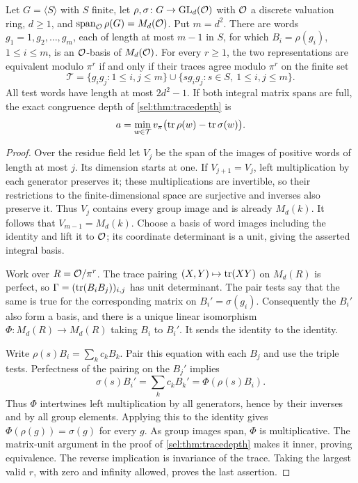 \begin{theorem}\label{sel:thm:finitewords}
Let $G=\langle S\rangle$ with $S$ finite, let
$\rho,\sigma\colon G\to\operatorname{GL}_d(\mathcal{O})$ with $\mathcal{O}$ a discrete valuation ring,
$d\ge1$, and $\operatorname{span}_{\mathcal{O}}\rho(G)=M_d(\mathcal{O})$. Put $m=d^2$. There
are words $g_1=1,g_2,\dots,g_m$, each of length at most $m-1$ in $S$, for
which $B_i=\rho(g_i)$, $1\le i\le m$, is an $\mathcal{O}$-basis of $M_d(\mathcal{O})$. For
every $r\ge1$, the two representations are equivalent modulo $\pi^r$ if and
only if their traces agree modulo $\pi^r$ on the finite set
\[
 \mathcal T=\{g_ig_j:1\le i,j\le m\}\cup\{sg_ig_j:s\in S,\ 1\le i,j\le m\}.
\]
All test words have length at most $2d^2-1$. If both integral matrix spans
are full, the exact congruence depth of \cref{sel:thm:tracedepth} is
\[
 a=\min_{w\in\mathcal T}v_\pi\bigl(\operatorname{tr}\rho(w)-\operatorname{tr}\sigma(w)\bigr).
\]
\end{theorem}

\begin{proof}
Over the residue field let $V_j$ be the span of the images of positive
words of length at most $j$. Its dimension starts at one. If
$V_{j+1}=V_j$, left multiplication by each generator preserves it; these
multiplications are invertible, so their restrictions to the
finite-dimensional space are surjective and inverses also preserve it. Thus
$V_j$ contains every group image and is already $M_d(k)$. It follows that
$V_{m-1}=M_d(k)$. Choose a basis of word images including the identity and
lift it to $\mathcal{O}$; its coordinate determinant is a unit, giving the asserted
integral basis.

Work over $R=\mathcal{O}/\pi^r$. The trace pairing $(X,Y)\mapsto\operatorname{tr}(XY)$ on
$M_d(R)$ is perfect, so $\Gamma=(\operatorname{tr}(B_iB_j))_{i,j}$ has unit determinant.
The pair tests say that the same is true for the corresponding matrix on
$B_i'=\sigma(g_i)$. Consequently the $B_i'$ also form a basis, and there is
a unique linear isomorphism $\Phi\colon M_d(R)\to M_d(R)$ taking $B_i$ to
$B_i'$. It sends the identity to the identity.

Write $\rho(s)B_i=\sum_kc_kB_k$. Pair this equation with each $B_j$ and use
the triple tests. Perfectness of the pairing on the $B_j'$ implies
\[
 \sigma(s)B_i'=\sum_kc_kB_k'=\Phi(\rho(s)B_i).
\]
Thus $\Phi$ intertwines left multiplication by all generators, hence by
their inverses and by all group elements. Applying this to the identity
gives $\Phi(\rho(g))=\sigma(g)$ for every $g$. As group images span, $\Phi$
is multiplicative. The matrix-unit argument in the proof of
\cref{sel:thm:tracedepth} makes it inner, proving equivalence. The reverse
implication is invariance of the trace. Taking the largest valid $r$, with
zero and infinity allowed, proves the last assertion.
\end{proof}

